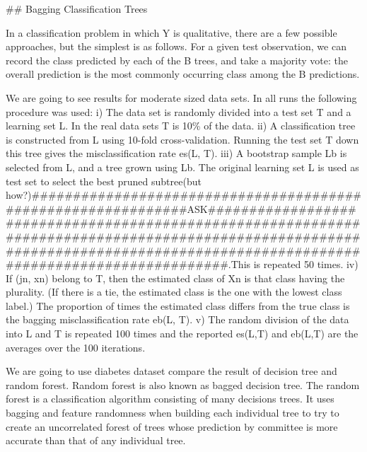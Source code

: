\documentclass[
]{article}
\begin{document}
\#\# Bagging Classification Trees

In a classification problem in which Y is qualitative, there are a few
possible approaches, but the simplest is as follows. For a given test
observation, we can record the class predicted by each of the B trees,
and take a majority vote: the overall prediction is the most commonly
occurring class among the B predictions.

We are going to see results for moderate sized data sets. In all runs
the following procedure was used: i) The data set is randomly divided
into a test set T and a learning set L. In the real data sets T is 10\%
of the data. ii) A classification tree is constructed from L using
10-fold cross-validation. Running the test set T down this tree gives
the misclassification rate es(L, T). iii) A bootstrap sample Lb is
selected from L, and a tree grown using Lb. The original learning set L
is used as test set to select the best pruned subtree(but
how?)\#\#\#\#\#\#\#\#\#\#\#\#\#\#\#\#\#\#\#\#\#\#\#\#\#\#\#\#\#\#\#\#\#\#\#\#\#\#\#\#\#\#\#\#\#\#\#\#\#\#\#\#\#\#\#\#\#\#\#\#\#\#ASK\#\#\#\#\#\#\#\#\#\#\#\#\#\#\#\#\#\#\#\#\#\#\#\#\#\#\#\#\#\#\#\#\#\#\#\#\#\#\#\#\#\#\#\#\#\#\#\#\#\#\#\#\#\#\#\#\#\#\#\#\#\#\#\#\#\#\#\#\#\#\#\#\#\#\#\#\#\#\#\#\#\#\#\#\#\#\#\#\#\#\#\#\#\#\#\#\#\#\#\#\#\#\#\#\#\#\#\#\#\#\#\#\#\#\#\#\#\#\#\#\#\#\#\#\#\#\#\#\#\#\#\#\#\#\#\#\#\#\#\#\#\#\#\#\#\#\#\#\#\#\#\#\#\#\#\#\#\#\#\#\#\#\#\#\#\#\#\#\#\#\#\#\#\#.This
is repeated 50 times. iv) If (jn, xn) belong to T, then the estimated
class of Xn is that class having the plurality. (If there is a tie, the
estimated class is the one with the lowest class label.) The proportion
of times the estimated class differs from the true class is the bagging
misclassification rate eb(L, T). v) The random division of the data into
L and T is repeated 100 times and the reported es(L,T) and eb(L,T) are
the averages over the 100 iterations.

We are going to use diabetes dataset compare the result of decision tree
and random forest. Random forest is also known as bagged decision tree.
The random forest is a classification algorithm consisting of many
decisions trees. It uses bagging and feature randomness when building
each individual tree to try to create an uncorrelated forest of trees
whose prediction by committee is more accurate than that of any
individual tree.
\end{document}
